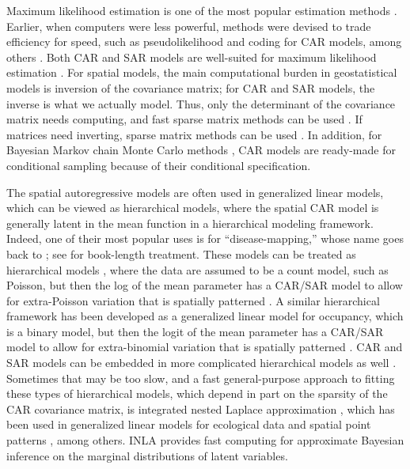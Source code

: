 \documentclass[11pt, titlepage]{article}\usepackage[]{graphicx}\usepackage[]{color}
\begin{document}
Maximum likelihood estimation is one of the most popular estimation methods \citep{Cres:stat:1993}. Earlier, when computers were less powerful, methods were devised to trade efficiency for speed, such as pseudolikelihood \citep{Besa:stat:1975} and coding \citep{Besa:spat:1974} for CAR models, among others \citep{Cres:stat:1993}.  Both CAR and SAR models are well-suited for maximum likelihood estimation \citep{Bane:Carl:Gelf:hier:2004}. For spatial models, the main computational burden in geostatistical models is inversion of the covariance matrix; for CAR and SAR models, the inverse is what we actually model.  Thus, only the determinant of the covariance matrix needs computing, and fast sparse matrix methods can be used \citep{ Pace:Barr:fast:1997, Pace:Barr:spar:1997}. If matrices need inverting, sparse matrix methods can be used \citep{Rue:Held:Gaus:2005}. In addition, for Bayesian Markov chain Monte Carlo methods \citep[MCMC,][]{Gelf:Smit:samp:1990}, CAR models are ready-made for conditional sampling because of their conditional specification.

The spatial autoregressive models are often used in generalized linear models, which can be viewed as hierarchical models, where the spatial CAR model is generally latent in the mean function in a hierarchical modeling framework. Indeed, one of their most popular uses is for ``disease-mapping,'' whose name goes back to \citet{Clay:Kald:empi:1987}; see \citet{Laws:Baye:2009} for book-length treatment.  These models can be treated as hierarchical models \citep{Cres:Cald:Clar:VerH:acco:2009}, where the data are assumed to be a count model, such as Poisson, but then the log of the mean parameter has a CAR/SAR model to allow for extra-Poisson variation that is spatially patterned \citep[e.g.,][]{Ver:Jans:spac:2007}.  A similar hierarchical framework has been developed as a generalized linear model for occupancy, which is a binary model, but then the logit of the mean parameter has a CAR/SAR model to allow for extra-binomial variation that is spatially patterned \citep{Mago:Ray:John:Valk:Daws:Bowm:mode:2007,Gard:Lawl:Ver:Mago:Kell:coar:2010,John:Conn:Hoot:Ray:Pond,Brom:John:Altw:Conq:spat:2014,Pole:Pond:Scha:Brow:Ray:John:occu:2014}.  CAR and SAR models can be embedded in more complicated hierarchical models as well \citep[e.g.,][]{Ver:Came:Bove:Lond:spat:2014}. Sometimes that may be too slow, and a fast general-purpose approach to fitting these types of hierarchical models, which depend in part on the sparsity of the CAR covariance matrix, is integrated nested Laplace approximation \citep[INLA,][]{Rue:Mart:Chop:appr:2009}, which has been used in generalized linear models for ecological data \citep[e.g.,][]{Haas:Hoot:Rizz:Meen:fore:2011,Aart:Fieb:Bras:Matt:quan:2013} and spatial point patterns \citep{Illi:Mart:Sorb:Gall:Zunz:Esqu:Trav:fitt:2013}, among others. INLA provides fast computing for approximate Bayesian inference on the marginal distributions of latent variables.
\end{document}
